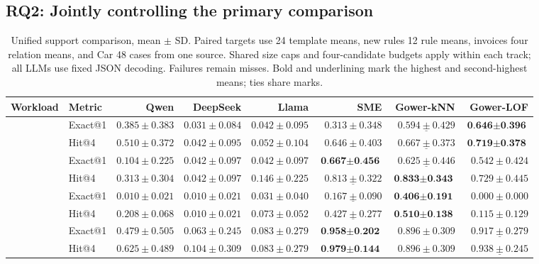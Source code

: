 \documentclass[conference]{IEEEtran}
\begin{document}
\subsection{RQ2: Jointly controlling the primary comparison}
\begin{table}[t]
\centering
\caption{Unified support comparison, mean $\pm$ SD. Paired targets use 24 template means, new rules 12 rule means, invoices four relation means, and Car 48 cases from one source. Shared size caps and four-candidate budgets apply within each track; all LLMs use fixed JSON decoding. Failures remain misses. Bold and underlining mark the highest and second-highest means; ties share marks.}
\begin{tabular}{|l|l|rrrrrr|}
\hline
Workload & Metric & Qwen & DeepSeek & Llama & SME & Gower-kNN & Gower-LOF \\
\hline
{} & Exact@1 & $0.385\pm0.383$ & $0.031\pm0.084$ & $0.042\pm0.095$ & $0.313\pm0.348$ & $\underline{0.594\pm0.429}$ & $\textbf{0.646}\pm\textbf{0.396}$ \\
 & Hit@4 & $0.510\pm0.372$ & $0.042\pm0.095$ & $0.052\pm0.104$ & $0.646\pm0.403$ & $\underline{0.667\pm0.373}$ & $\textbf{0.719}\pm\textbf{0.378}$ \\
\hline
{} & Exact@1 & $0.104\pm0.225$ & $0.042\pm0.097$ & $0.042\pm0.097$ & $\textbf{0.667}\pm\textbf{0.456}$ & $\underline{0.625\pm0.446}$ & $0.542\pm0.424$ \\
 & Hit@4 & $0.313\pm0.304$ & $0.042\pm0.097$ & $0.146\pm0.225$ & $\underline{0.813\pm0.322}$ & $\textbf{0.833}\pm\textbf{0.343}$ & $0.729\pm0.445$ \\
\hline
{} & Exact@1 & $0.010\pm0.021$ & $0.010\pm0.021$ & $0.031\pm0.040$ & $\underline{0.167\pm0.090}$ & $\textbf{0.406}\pm\textbf{0.191}$ & $0.000\pm0.000$ \\
 & Hit@4 & $0.208\pm0.068$ & $0.010\pm0.021$ & $0.073\pm0.052$ & $\underline{0.427\pm0.277}$ & $\textbf{0.510}\pm\textbf{0.138}$ & $0.115\pm0.129$ \\
\hline
{} & Exact@1 & $0.479\pm0.505$ & $0.063\pm0.245$ & $0.083\pm0.279$ & $\textbf{0.958}\pm\textbf{0.202}$ & $0.896\pm0.309$ & $\underline{0.917\pm0.279}$ \\
 & Hit@4 & $0.625\pm0.489$ & $0.104\pm0.309$ & $0.083\pm0.279$ & $\textbf{0.979}\pm\textbf{0.144}$ & $0.896\pm0.309$ & $\underline{0.938\pm0.245}$ \\
\hline
\end{tabular}
\label{tab:unified}
\end{table}
\end{document}
